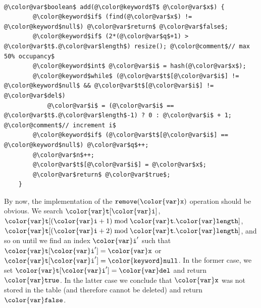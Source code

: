 \documentclass[10pt]{book}
\theoremstyle{plain}
\theoremstyle{definition}
\begin{document}
 \ \vspace{.5ex}\begin{Verbatim}[gobble=1,tabsize=2,frame=single,framerule=1.2pt,commandchars=\\@\$,label=\texttt{LinearHashTable},labelposition=topline]
	@\color@var$boolean$ add(@\color@keyword$T$ @\color@var$x$) {
		@\color@keyword$if$ (find(@\color@var$x$) != @\color@keyword$null$) @\color@var$return$ @\color@var$false$;
		@\color@keyword$if$ (2*(@\color@var$q$+1) > @\color@var$t$.@\color@var$length$) resize(); @\color@comment$// max 50% occupancy$
		@\color@keyword$int$ @\color@var$i$ = hash(@\color@var$x$);
		@\color@keyword$while$ (@\color@var$t$[@\color@var$i$] != @\color@keyword$null$ && @\color@var$t$[@\color@var$i$] != @\color@var$del$)
			@\color@var$i$ = (@\color@var$i$ == @\color@var$t$.@\color@var$length$-1) ? 0 : @\color@var$i$ + 1; @\color@comment$// increment i$
		@\color@keyword$if$ (@\color@var$t$[@\color@var$i$] == @\color@keyword$null$) @\color@var$q$++;
		@\color@var$n$++;
		@\color@var$t$[@\color@var$i$] = @\color@var$x$;
		@\color@var$return$ @\color@var$true$;
	}
\end{Verbatim}


By now, the implementation of the \ensuremath{\mathtt{remove({\color{var}x})}} operation should be obvious.
We search \ensuremath{\mathtt{{\color{var}t}[{\color{var}i}]}}, $\ensuremath{\mathtt{{\color{var}t}}}[(\ensuremath{\mathtt{{\color{var}i}}}+1)\bmod \ensuremath{\mathtt{{\color{var}t}.{\color{var}length}}}]$, $\ensuremath{\mathtt{{\color{var}t}}}[(\ensuremath{\mathtt{{\color{var}i}}}+2)\bmod
\ensuremath{\mathtt{{\color{var}t}.{\color{var}length}}}]$, and so on until we find an index \ensuremath{\mathtt{{\color{var}i}'}} such that \ensuremath{\mathtt{{\color{var}t}[{\color{var}i}']={\color{var}x}}}
or \ensuremath{\mathtt{{\color{var}t}[{\color{var}i}']={\color{keyword}null}}}.  In the former case, we set \ensuremath{\mathtt{{\color{var}t}[{\color{var}i}']={\color{var}del}}} and return
\ensuremath{\mathtt{{\color{var}true}}}.  In the latter case we conclude that \ensuremath{\mathtt{{\color{var}x}}} was not stored in the
table (and therefore cannot be deleted) and return \ensuremath{\mathtt{{\color{var}false}}}.
\end{document}
